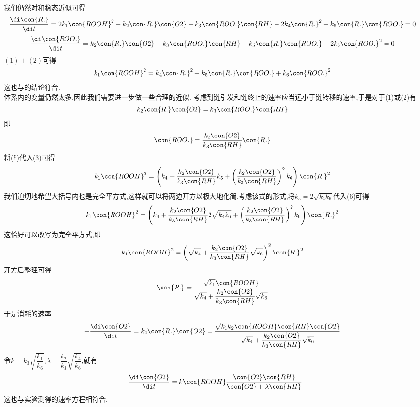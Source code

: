 \documentclass{ctexart}
\begin{document}
\begin{derivation}\setcounter{equation}{0}
    我们仍然对和稳态近似可得
    \begin{equation}
        \dfrac{\di\con{R.}}{\di t}=2k_1\con{ROOH}^2-k_2\con{R.}\con{O2}+k_3\con{ROO.}\con{RH}-2k_4\con{R.}^2-k_5\con{R.}\con{ROO.}=0
    \end{equation}
    \begin{equation}
        \dfrac{\di\con{ROO.}}{\di t}=k_2\con{R.}\con{O2}-k_3\con{ROO.}\con{RH}-k_5\con{R.}\con{ROO.}-2k_6\con{ROO.}^2=0
    \end{equation}
    $(1)+(2)$可得
    \begin{equation}
        k_1\con{ROOH}^2=k_4\con{R.}^2+k_5\con{R.}\con{ROO.}+k_6\con{ROO.}^2
    \end{equation}
    这也与的结论符合.\\
    体系内的变量仍然太多,因此我们需要进一步做一些合理的近似.%
    考虑到链引发和链终止的速率应当远小于链转移的速率,于是对于(1)或(2)有
    \begin{equation}
        k_2\con{R.}\con{O2}=k_3\con{ROO.}\con{RH}
    \end{equation}
    即
    \begin{equation}
        \con{ROO.}=\dfrac{k_2\con{O2}}{k_3\con{RH}}\con{R.}
    \end{equation}
    将(5)代入(3)可得
    \begin{equation}
        k_1\con{ROOH}^2=\left(k_4+\dfrac{k_2\con{O2}}{k_3\con{RH}}k_5+\left(\dfrac{k_2\con{O2}}{k_3\con{RH}}\right)^2k_6\right)\con{R.}^2
    \end{equation}
    我们迫切地希望大括号内也是完全平方式,这样就可以将两边开方以极大地化简.考虑该式的形式,将$k_5=2\sqrt{k_4k_6}$代入(6)可得
    \begin{equation}
        k_1\con{ROOH}^2=\left(k_4+\dfrac{k_2\con{O2}}{k_3\con{RH}}2\sqrt{k_4k_6}+\left(\dfrac{k_2\con{O2}}{k_3\con{RH}}\right)^2k_6\right)\con{R.}^2
    \end{equation}
    这恰好可以改写为完全平方式,即
    \begin{equation}
        k_1\con{ROOH}^2=\left(\sqrt{k_4}+\dfrac{k_2\con{O2}}{k_3\con{RH}}\sqrt{k_6}\right)^2\con{R.}^2
    \end{equation}
    开方后整理可得
    \begin{equation}
        \con{R.}=\dfrac{\sqrt{k_1}\con{ROOH}}{\sqrt{k_4}+\dfrac{k_2\con{O2}}{k_3\con{RH}}\sqrt{k_6}}
    \end{equation}
    于是消耗的速率
    \begin{equation}
        -\dfrac{\di\con{O2}}{\di t}=k_2\con{R.}\con{O2}=\dfrac{\sqrt{k_1}k_2\con{ROOH}\con{RH}\con{O2}}{\sqrt{k_4}+\dfrac{k_2\con{O2}}{k_3\con{RH}}\sqrt{k_6}}
    \end{equation}
    令$k=k_3\sqrt{\dfrac{k_1}{k_6}},\lambda=\dfrac{k_2}{k_3}\sqrt{\dfrac{k_4}{k_6}}$,就有
    \begin{equation}
        -\dfrac{\di\con{O2}}{\di t}=k\con{ROOH}\dfrac{\con{O2}\con{RH}}{\con{O2}+\lambda\con{RH}}
    \end{equation}
    这也与实验测得的速率方程相符合.
\end{derivation}
\end{document}
